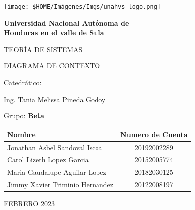 \documentclass[12pt]{article}
\begin{document}
\begin{titlepage}

  \begin{center}
    {\texttt{[image: \$HOME/Imágenes/Imgs/unahvs-logo.png]}\par}
  
    {\bfseries\Huge Universidad Nacional Autónoma de\\
                     Honduras en el valle de Sula \par}
  
    \vspace{1cm}
  
    {\scshape\huge TEORÍA DE SISTEMAS\par}
  
    \vspace{1cm}
  
    {\scshape\Large 
      DIAGRAMA DE CONTEXTO 
    }
  
    \vfill 
    {\large Catedrático:\par} %
    {\large Ing. Tania Melissa Pineda Godoy\par} %
  
    \vfill
    {\large Grupo: \textbf{Beta} \par}

    \begin{tabular}{| l | c |}
      \hline
      Nombre & Numero de Cuenta\\ \hline
      Jonathan Asbel Sandoval Iscoa & 20192002289\\
      Carol Lizeth Lopez Garcia & 20152005774\\
      Maria Gaudalupe Aguilar Lopez & 20182030125\\
      Jimmy Xavier Triminio Hernandez & 20122008197 \\
      \hline
     \end{tabular}

    \vfill
    {\large FEBRERO 2023\par} %

  \end{center}

\end{titlepage}

\newpage
\tableofcontents
\end{document}

